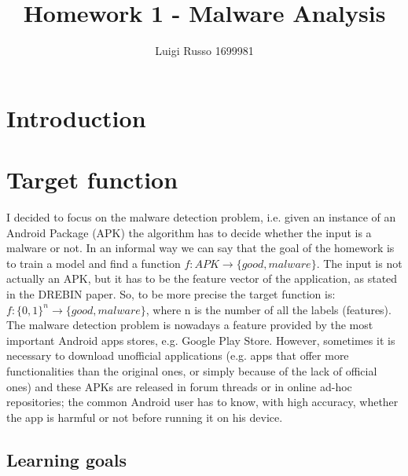 \documentclass[12pt]{article}
\title{Homework 1 - Malware Analysis}
\author{Luigi Russo 1699981}
\begin{document}
	
\maketitle
	
\section{Introduction}

\section{Target function}
I decided to focus on the malware detection problem, i.e. given an instance of an Android Package (APK) the algorithm has to decide whether the input is a malware or not. In an informal way we can say that the goal of the homework is to train a model and find a function
$ f: APK \rightarrow \{good, malware\} $.
The input is not actually an APK, but it has to be the feature vector of the application, as stated in the DREBIN \cite{DREBIN} paper. So, to be more precise the target function is:
$ f: \{0,1\}^n  \rightarrow \{good, malware\} $, where n is the number of all the labels (features).
The malware detection problem is nowadays a feature provided by the most important Android apps stores, e.g. Google Play Store. However, sometimes it is necessary to download unofficial applications (e.g. apps that offer more functionalities than the original ones, or simply because of the lack of official ones) and these APKs are released in forum threads or in online ad-hoc repositories; the common Android user has to know, with high accuracy, whether the app is harmful or not before running it on his device.

\subsection{Learning goals}
\end{document}
